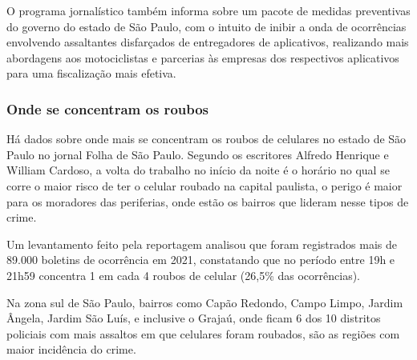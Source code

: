         O programa jornalístico também informa sobre um pacote de medidas preventivas
        do governo do estado de São Paulo, com o intuito de inibir a onda de ocorrências
        envolvendo assaltantes disfarçados de entregadores de aplicativos, realizando mais
        abordagens aos motociclistas e parcerias às empresas dos respectivos aplicativos para
        uma fiscalização mais efetiva.

        \subsubsection{Onde se concentram os roubos}
        Há dados sobre onde mais se concentram os roubos de celulares no estado de São 
        Paulo no jornal Folha de São Paulo. Segundo os escritores Alfredo Henrique e William
        Cardoso, a volta do trabalho no início da noite é o horário no qual se corre o maior
        risco de ter o celular roubado na capital paulista, o perigo é maior para os moradores
        das periferias, onde estão os bairros que lideram nesse tipos de crime.

        Um levantamento feito pela reportagem analisou que foram registrados mais de 89.000
        boletins de ocorrência em 2021, constatando que no período entre 19h e 21h59 concentra
        1 em cada 4 roubos de celular (26,5\% das ocorrências).
        
        Na zona sul de São Paulo, bairros como Capão Redondo, Campo Limpo, Jardim Ângela,
        Jardim São Luís, e inclusive o Grajaú, onde ficam 6 dos 10 distritos policiais com
        mais assaltos em que celulares foram roubados, são as regiões com maior incidência
        do crime.

